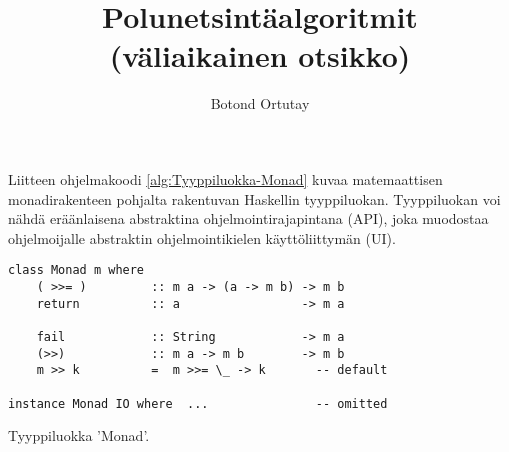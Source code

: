 \documentclass[language=finnish,version=final,mainfont=none,sharelatex=false]{utuftthesis}
\providecommand{\algorithmname}{Algoritmi}
\begin{document}
\title{Polunetsintäalgoritmit (väliaikainen otsikko)}
\author{Botond Ortutay}

\maketitle


\tableofcontents

\listoffigures

\listoftables

\listofacronyms

\renewcommand{\algorithmname}{\listingscaption}


\begin{comment}
To better organize things, create a new tex file for each chapter
and input it below.

Avoid using the å, ä, ö or <space> characters in referred names and
underscores \_ in file names (may break hyperref).

Good luck!
\end{comment}



%
%


\printbibliography

\begin{comment}
Important! Create the appendix chapters with command \textbackslash appchapter\{some
name\} instead of \textbackslash chapter\{some name\} for the automagic
page counting to work!
\end{comment}



Liitteen ohjelmakoodi \ref{alg:Tyyppiluokka-Monad} kuvaa matemaattisen
monadirakenteen pohjalta rakentuvan Haskellin tyyppiluokan. Tyyppiluokan
voi nähdä eräänlaisena abstraktina ohjelmointirajapintana (API),
joka muodostaa ohjelmoijalle abstraktin ohjelmointikielen käyttöliittymän
(UI).

\begin{algorithm}[tbh]
\begin{verbatim}
class Monad m where
    ( >>= )         :: m a -> (a -> m b) -> m b
    return          :: a                 -> m a

    fail            :: String            -> m a
    (>>)            :: m a -> m b        -> m b
    m >> k          =  m >>= \_ -> k       -- default

instance Monad IO where  ...               -- omitted
\end{verbatim}

\caption{Tyyppiluokka 'Monad'.\label{alg:Tyyppiluokka-Monad}}
\end{algorithm}
\end{document}
